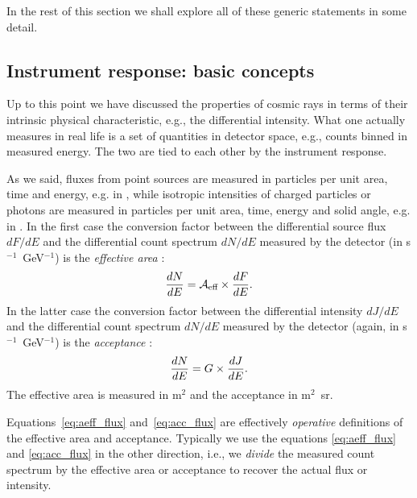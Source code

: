 In the rest of this section we shall explore all of these generic statements in
some detail.


\subsection{Instrument response: basic concepts}
\label{sec:irf}

Up to this point we have discussed the properties of cosmic rays in terms of their
intrinsic physical characteristic, e.g., the differential intensity. What one
actually measures in real life is a set of quantities in detector space, e.g.,
counts binned in measured energy. The two are tied to each other by the instrument
response.

As we said, fluxes from point sources are measured in particles per unit area,
time and energy, e.g. in \fluxunits, while isotropic intensities of charged particles
or photons are measured in particles per unit area, time, energy and solid angle,
e.g. in \intensityunits. In the first case the conversion factor between the
differential source flux $dF/dE$ and the differential count spectrum $dN/dE$ measured
by the detector (in s$^{-1}$~GeV$^{-1}$) is the \emph{effective area} \aeff:
\begin{align}\label{eq:aeff_flux}
  \frac{dN}{dE} = \mathcal{A}_\text{eff} \times \frac{dF}{dE}.
\end{align}
In the latter case the conversion factor between the differential intensity $dJ/dE$
and the differential count spectrum $dN/dE$ measured by the detector (again, in
s$^{-1}$~GeV$^{-1}$) is the \emph{acceptance} \accept:
\begin{align}\label{eq:acc_flux}
  \frac{dN}{dE} = G \times \frac{dJ}{dE}.
\end{align}
The effective area is measured in m$^2$ and the acceptance in m$^2$~sr.

Equations~\eqref{eq:aeff_flux} and~\eqref{eq:acc_flux} are effectively
\emph{operative} definitions of the effective area and acceptance.
Typically we use the equations \eqref{eq:aeff_flux} and \eqref{eq:acc_flux} in the
other direction, i.e., we \emph{divide} the measured count
spectrum by the effective area or acceptance to recover the actual flux or intensity.

